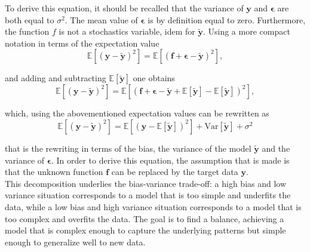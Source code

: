 \documentclass[
    article
 reprint,            %
 amsmath,amssymb,
 aps,
]{revtex4-2}
\begin{document}
To derive this equation, it should be recalled that the variance of $\boldsymbol{y}$ and $\boldsymbol{\epsilon}$ are both equal to $\sigma^2$. The mean value of $\boldsymbol{\epsilon}$ is by definition equal to zero. Furthermore, the function $f$ is not a stochastics variable, idem for $\boldsymbol{\tilde{y}}$.
Using a more compact notation in terms of the expectation value
$$
\mathbb{E}\left[(\boldsymbol{y}-\boldsymbol{\tilde{y}})^2\right]=\mathbb{E}\left[(\boldsymbol{f}+\boldsymbol{\epsilon}-\boldsymbol{\tilde{y}})^2\right],
$$

and adding and subtracting $\mathbb{E}\left[\boldsymbol{\tilde{y}}\right]$ one obtains 
$$
\mathbb{E}\left[(\boldsymbol{y}-\boldsymbol{\tilde{y}})^2\right]=\mathbb{E}\left[(\boldsymbol{f}+\boldsymbol{\epsilon}-\boldsymbol{\tilde{y}}+\mathbb{E}\left[\boldsymbol{\tilde{y}}\right]-\mathbb{E}\left[\boldsymbol{\tilde{y}}\right])^2\right],
$$

which, using the abovementioned expectation values can be rewritten as
\begin{equation}
    \label{eq: bias-var-...}
\mathbb{E}\left[(\boldsymbol{y}-\boldsymbol{\tilde{y}})^2\right]=\mathbb{E}\left[(\boldsymbol{y}-\mathbb{E}\left[\boldsymbol{\tilde{y}}\right])^2\right]+\mathrm{Var}\left[\boldsymbol{\tilde{y}}\right]+\sigma^2
\end{equation}


that is the rewriting in terms of the bias, the variance of the model $\boldsymbol{\tilde{y}}$ and the variance of $\boldsymbol{\epsilon}$. \cite{misc} 
In order to derive this equation, the assumption that is made is that the unknown function $\boldsymbol{f}$ can be replaced by the target data $\boldsymbol{y}$.\\
This decomposition underlies the bias-variance trade-off: a high bias and low variance situation corresponds to a model that is too simple and underfits the data, while a low bias and high variance situation corresponds to a model that is too complex and overfits the data.
The goal is to find a balance, achieving a model that is complex enough to capture the underlying patterns but simple enough to generalize well to new data.\\\\
\end{document}
